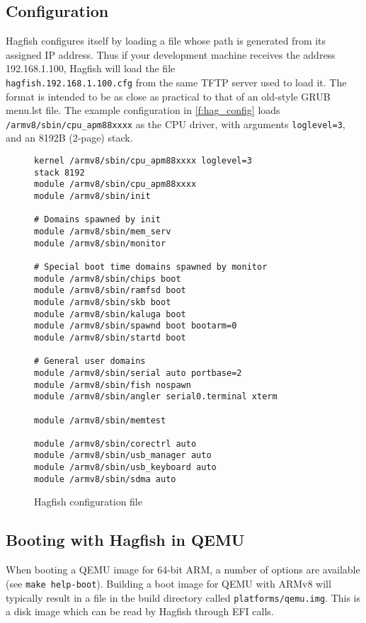 \documentclass[a4paper,twoside]{report}
\def\qemu{QEMU\xspace}
\begin{document}
\subsection{Configuration}

Hagfish configures itself by loading a file whose path is generated from its
assigned IP address. Thus if your development machine receives the address
192.168.1.100, Hagfish will load the file\\
\texttt{hagfish.192.168.1.100.cfg}
from the same TFTP server used to load it. The format is intended to be as
close as practical to that of an old-style GRUB menu.lst file. The example
configuration in \autoref{f:hag_config} loads
\texttt{/armv8/sbin/cpu\_apm88xxxx} as the CPU driver, with arguments
\texttt{loglevel=3}, and an 8192B (2-page) stack.

\begin{figure}[htb]
\begin{center}
\begin{lstlisting}
kernel /armv8/sbin/cpu_apm88xxxx loglevel=3
stack 8192
module /armv8/sbin/cpu_apm88xxxx
module /armv8/sbin/init

# Domains spawned by init
module /armv8/sbin/mem_serv
module /armv8/sbin/monitor

# Special boot time domains spawned by monitor
module /armv8/sbin/chips boot
module /armv8/sbin/ramfsd boot
module /armv8/sbin/skb boot
module /armv8/sbin/kaluga boot
module /armv8/sbin/spawnd boot bootarm=0
module /armv8/sbin/startd boot

# General user domains
module /armv8/sbin/serial auto portbase=2
module /armv8/sbin/fish nospawn
module /armv8/sbin/angler serial0.terminal xterm

module /armv8/sbin/memtest

module /armv8/sbin/corectrl auto
module /armv8/sbin/usb_manager auto
module /armv8/sbin/usb_keyboard auto
module /armv8/sbin/sdma auto
\end{lstlisting}
\end{center}
\caption{Hagfish configuration file}
\label{f:hag_config}
\end{figure}



\subsection{Booting with Hagfish in \qemu}\label{c:qemu}

When booting a \qemu image for 64-bit ARM, a number of options are
available (see \texttt{make help-boot}).  Building a boot image for
\qemu with ARMv8 will typically result in a file in the build directory
called \texttt{platforms/qemu.img}.  This is a disk image which can be
read by Hagfish through EFI calls.
\end{document}
